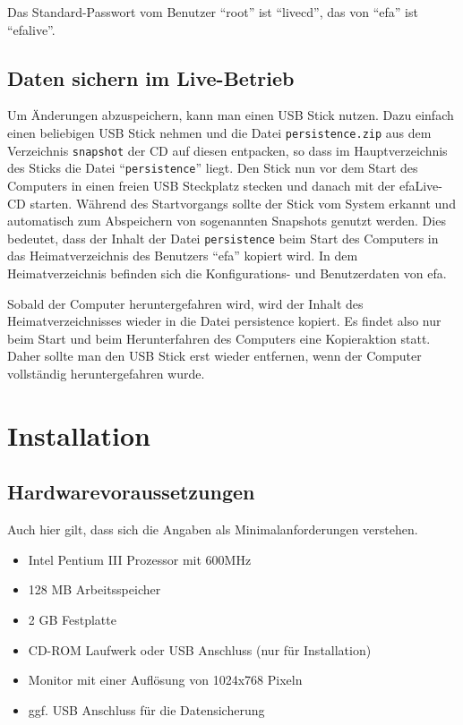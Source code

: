 \documentclass[a4paper,12pt,twoside]{article}
\begin{document}
Das Standard-Passwort vom Benutzer "`root"' ist "`livecd"', das von
"`efa"' ist "`efalive"'.


\subsection{Daten sichern im Live-Betrieb}
\label{sct:live_sichern}
Um Änderungen abzuspeichern, kann man einen USB Stick nutzen. Dazu
einfach einen beliebigen USB Stick nehmen und die Datei \texttt{persistence.zip}
aus dem Verzeichnis \texttt{snapshot} der CD auf diesen entpacken, so dass im
Hauptverzeichnis des Sticks die Datei "`\texttt{persistence}"' liegt. Den Stick nun
vor dem Start des Computers in einen freien USB Steckplatz stecken und
danach mit der efaLive-CD starten. Während des Startvorgangs sollte der
Stick vom System erkannt und automatisch zum Abspeichern von
sogenannten Snapshots genutzt werden. Dies bedeutet, dass der Inhalt
der Datei \texttt{persistence} beim Start des Computers in das Heimatverzeichnis
des Benutzers "`efa"' kopiert wird. In dem
Heimatverzeichnis befinden sich die Konfigurations- und Benutzerdaten
von efa.

Sobald der Computer heruntergefahren wird, wird der Inhalt des
Heimatverzeichnisses wieder in die Datei persistence kopiert. Es findet
also nur beim Start und beim Herunterfahren des Computers eine
Kopieraktion statt. Daher sollte man den USB Stick erst wieder
entfernen, wenn der Computer vollständig heruntergefahren wurde.


\section{Installation}
\label{sct:installation}
\subsection{Hardwarevoraussetzungen}
\label{sct:inst_hardware}
Auch hier gilt, dass sich die Angaben als Minimalanforderungen
verstehen.

\begin{itemize}
    \item Intel Pentium III Prozessor mit 600MHz
    \item 128 MB Arbeitsspeicher
    \item 2 GB Festplatte
    \item CD-ROM Laufwerk oder USB Anschluss (nur für Installation)
    \item Monitor mit einer Auflösung von 1024x768 Pixeln
    \item ggf. USB Anschluss für die Datensicherung
\end{itemize}
\end{document}
